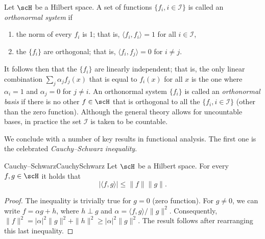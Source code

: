 Let $\scH$ be a Hilbert space. A set of functions $\{f_i, i \in \mathcal{I}\}$ is called an \textit{orthonormal system} if
\begin{enumerate}
	\item the norm of every $f_i$ is 1; that is, $\langle f_i, f_i \rangle = 1$ for all $i \in \mathcal{I}$,
	\item the $\{f_i\}$ are orthogonal; that is, $\langle f_i, f_j \rangle = 0$ for $i \neq j$.
\end{enumerate}
It follows then that the $\{f_i\}$ are linearly independent; that is, the only linear combination $\sum_j \alpha_j f_j(x)$ that is equal to $f_i(x)$ for all $x$ is the one where $\alpha_i = 1$ and $\alpha_j = 0$ for $j \neq i$. An orthonormal system $\{f_i\}$ is called an \textit{orthonormal basis} if there is no other $f \in \scH$ that is orthogonal to all the $\{f_i, i \in \mathcal{I}\}$ (other than the zero function). Although the general theory allows for uncountable bases, in practice the set $\mathcal{I}$ is taken to be countable.

We conclude with a number of key results in functional analysis. The first one is the celebrated \textit{Cauchy--Schwarz inequality}.

\begin{thm}{Cauchy--Schwarz}{CauchySchwarz}
	Let $\scH$ be a Hilbert space. For every $f, g \in \scH$ it holds that
	\begin{equation*}
		|\langle f, g \rangle| \le \|f\| \|g\|.
	\end{equation*}
\end{thm}

\begin{proof}
	The inequality is trivially true for $g = 0$ (zero function). For $g \neq 0$, we can write $f = \alpha g + h$, where $h \perp g$ and $\alpha = \langle f, g \rangle / \|g\|^2$. Consequently, $\|f\|^2 = |\alpha|^2 \|g\|^2 + \|h\|^2 \ge |\alpha|^2 \|g\|^2$. The result follows after rearranging this last inequality.
\end{proof}

